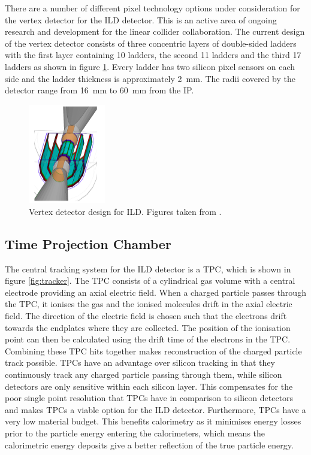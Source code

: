 There are a number of different pixel technology options under consideration for the vertex detector for the ILD detector.  This is an active area of ongoing research and development for the linear collider collaboration.  The current design of the vertex detector consists of three concentric layers of double-sided ladders with the first layer containing 10 ladders, the second 11 ladders and the third 17 ladders as shown in figure \ref{fig:vertexpicture}.  Every ladder has two silicon pixel sensors on each side and the ladder thickness is approximately 2~mm.  The radii covered by the detector range from 16~mm to 60~mm from the IP.

\begin{figure}[h!]
\centering
\includegraphics[width=0.3\textwidth]{LCDetectorsAndPFlow/Plots/Pictures/Vertex3.png}
\caption[Vertex detector design for ILD.  Figures taken from \cite{arXiv:1006.3396}.]{Vertex detector design for ILD.  Figures taken from \cite{arXiv:1006.3396}.}
\label{fig:vertexpicture}
\end{figure} 


\subsection{Time Projection Chamber}
The central tracking system for the ILD detector is a TPC, which is shown in figure \ref{fig:tracker}.  The TPC consists of a cylindrical gas volume with a central electrode providing an axial electric field.  When a charged particle passes through the TPC, it ionises the gas and the ionised molecules drift in the axial electric field.  The direction of the electric field is chosen such that the electrons drift towards the endplates where they are collected.  The position of the ionisation point can then be calculated using the drift time of the electrons in the TPC.  Combining these TPC hits together makes reconstruction of the charged particle track possible.  TPCs have an advantage over silicon tracking in that they continuously track any charged particle passing through them, while silicon detectors are only sensitive within each silicon layer.  This compensates for the poor single point resolution that TPCs have in comparison to silicon detectors and makes TPCs a viable option for the ILD detector.  Furthermore, TPCs have a very low material budget.  This benefits calorimetry as it minimises energy losses prior to the particle energy entering the calorimeters, which means the calorimetric energy deposits give a better reflection of the true particle energy.  

